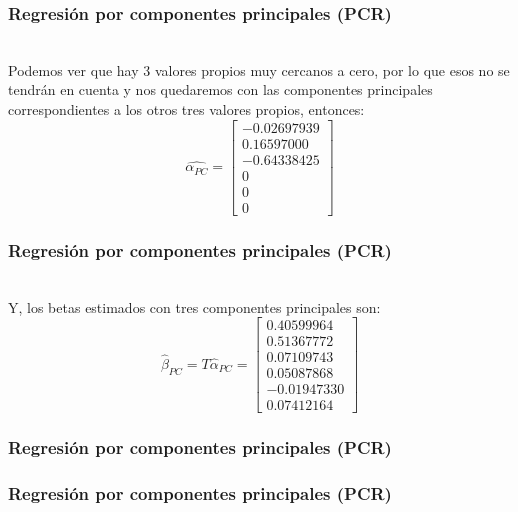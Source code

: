 \documentclass[12pt]{beamer}
\begin{document}
\begin{frame}
\frametitle{Regresión por componentes principales (PCR)}
~\\Podemos ver que hay 3 valores propios muy cercanos a cero, por lo que esos no se tendrán en cuenta y nos quedaremos con las componentes principales correspondientes a los otros tres valores propios, entonces:
$$\hat{\alpha_{PC}}=\left[\begin{matrix}
 -0.02697939 \\ 
 0.16597000 \\ 
 -0.64338425 \\ 
0 \\ 
 0 \\ 
 0
 \end{matrix}\right]$$
\end{frame}

\begin{frame}
\frametitle{Regresión por componentes principales (PCR)}
~\\Y, los betas estimados con tres componentes principales son:
$$\hat{\beta}_{PC}=T\hat{\alpha}_{PC}=\left[\begin{matrix}
 0.40599964 \\ 
 0.51367772 \\ 
 0.07109743 \\ 
 0.05087868 \\ 
 -0.01947330 \\ 
 0.07412164
 \end{matrix}\right]$$
\end{frame}

\begin{frame}
\frametitle{Regresión por componentes principales (PCR)}

\end{frame}

\begin{frame}
\frametitle{Regresión por componentes principales (PCR)}

\end{frame}
\end{document}
